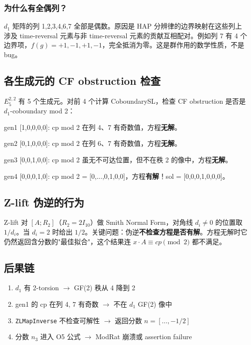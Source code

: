 \documentclass[a4paper,fontset=ubuntu,12pt]{ctexart}
\begin{document}
\subsubsection{为什么有全偶列？}

$d_1$ 矩阵的列 1,2,3,4,6,7 全部是偶数。原因是 HAP 分辨律的边界映射在这些列上涉及 time-reversal 元素与非 time-reversal 元素的贡献互相配对。例如列 7 有 4 个边界项，$f(g) = +1, -1, +1, -1$，完全抵消为零。这是群作用的数学性质，不是 bug。

\subsection{各生成元的 CF obstruction 检查}

$E_5^{2,2}$ 有 5 个生成元。对前 4 个计算 CoboundarySL，检查 CF obstruction 是否是 $d_1$-coboundary mod 2：

gen1 [1,0,0,0,0]: cp mod 2 在列 4、7 有奇数值，方程\textbf{无解}。

gen2 [0,1,0,0,0]: cp mod 2 在列 6、7 有奇数值，方程\textbf{无解}。

gen3 [0,0,1,0,0]: cp mod 2 虽无不可达位置，但不在秩 2 的像中，方程\textbf{无解}。

gen4 [0,0,0,1,0]: cp mod 2 = [0,...,0,1,0,0]，方程\textbf{有解}！sol = [0,0,0,1,0,0,0]。

\subsection{Z-lift 伪逆的行为}

Z-lift 对 $[A; R_2]$（$R_2 = 2I_{10}$）做 Smith Normal Form，对角线 $d_i \neq 0$ 的位置取 $1/d_i$。当 $d_i = 2$ 时给出 $1/2$。关键问题：伪逆\textbf{不检查方程是否有解}。方程无解时它仍然返回含分数的"最佳拟合"，这个结果连 $x \cdot A \equiv cp \pmod{2}$ 都不满足。

\subsection{后果链}
\begin{enumerate}
\item $d_1$ 有 2-torsion $\to$ GF(2) 秩从 4 降到 2
\item gen1 的 cp 在列 4, 7 有奇数 $\to$ 不在 $d_1$ GF(2) 像中
\item \texttt{ZLMapInverse} 不检查可解性 $\to$ 返回分数 $n = [\ldots, -1/2]$
\item 分数 $n_3$ 进入 O5 公式 $\to$ ModRat 崩溃或 assertion failure
\end{enumerate}
\end{document}
